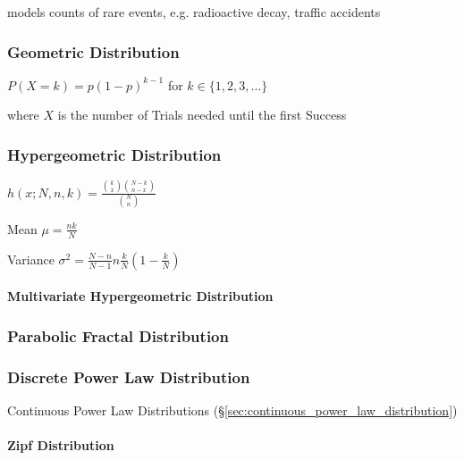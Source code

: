 models counts of rare events, e.g. radioactive decay, traffic accidents



\subsubsection{Geometric Distribution}\label{sec:geometric_distribution}

$P(X = k) = p(1-p)^{k-1}$ for $k \in \{1, 2, 3, \ldots\}$

where $X$ is the number of Trials needed until the first Success



\subsubsection{Hypergeometric Distribution}
\label{sec:hypergeometric_distribution}

$h(x; N, n, k) = \frac{\binom{k}{x} \binom{N-k}{n-x}}{\binom{N}{n}}$

Mean $\mu = \frac{nk}{N}$

Variance $\sigma^2 = \frac{N-n}{N-1} n \frac{k}{N}(1 - \frac{k}{N})$



\paragraph{Multivariate Hypergeometric Distribution}
\label{sec:multivariate_hypergeometric}\hfill



\subsubsection{Parabolic Fractal Distribution}
\label{sec:parabolic_fractal_distribution}

\subsubsection{Discrete Power Law Distribution}
\label{sec:discrete_power_law_distribution}

\fist Continuous Power Law Distributions
(\S\ref{sec:continuous_power_law_distribution})



\paragraph{Zipf Distribution}\label{sec:zipf_distribution}\hfill

